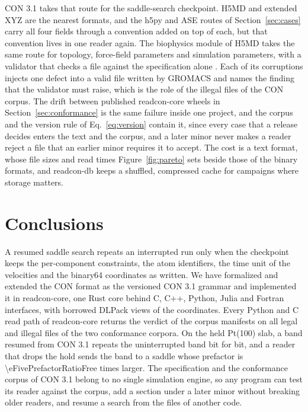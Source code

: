 \documentclass[preprint,12pt]{elsarticle}
\newcommand{\sigfig}[2]{\num[round-mode=figures,round-precision=#1]{#2}}
\begin{document}
CON 3.1 takes that route for the saddle-search checkpoint.
H5MD and extended XYZ are the nearest formats, and the h5py and ASE routes of Section~\ref{sec:cases} carry all four fields through a convention added on top of each, but that convention lives in one reader again.
The biophysics module of H5MD takes the same route for topology, force-field parameters and simulation parameters, with a validator that checks a file against the specification alone \cite{johanssonH5mdBiophysicsModule2026}.
Each of its corruptions injects one defect into a valid file written by GROMACS and names the finding that the validator must raise, which is the role of the illegal files of the CON corpus.
The drift between published readcon-core wheels in Section~\ref{sec:conformance} is the same failure inside one project, and the corpus and the version rule of Eq.~\eqref{eq:version} contain it, since every case that a release decides enters the text and the corpus, and a later minor never makes a reader reject a file that an earlier minor requires it to accept.
The cost is a text format, whose file sizes and read times Figure~\ref{fig:pareto} sets beside those of the binary formats, and readcon-db keeps a shuffled, compressed cache for campaigns where storage matters.

\section{Conclusions}\label{sec:conclusions}
A resumed saddle search repeats an interrupted run only when the checkpoint keeps the per-component constraints, the atom identifiers, the time unit of the velocities and the binary64 coordinates as written.
We have formalized and extended the CON format as the versioned CON 3.1 grammar and implemented it in readcon-core, one Rust core behind C, C++, Python, Julia and Fortran interfaces, with borrowed DLPack views of the coordinates.
Every Python and C read path of readcon-core returns the verdict of the corpus manifests on all \corpusFiles{} legal and illegal files of the two conformance corpora.
On the held Pt(100) slab, a band resumed from CON 3.1 repeats the uninterrupted band bit for bit, and a reader that drops the hold sends the band to a saddle whose prefactor is \sigfig{2}{\eFivePrefactorRatioFree} times larger.
The specification and the conformance corpus of CON 3.1 belong to no single simulation engine, so any program can test its reader against the corpus, add a section under a later minor without breaking older readers, and resume a search from the files of another code.
\end{document}
